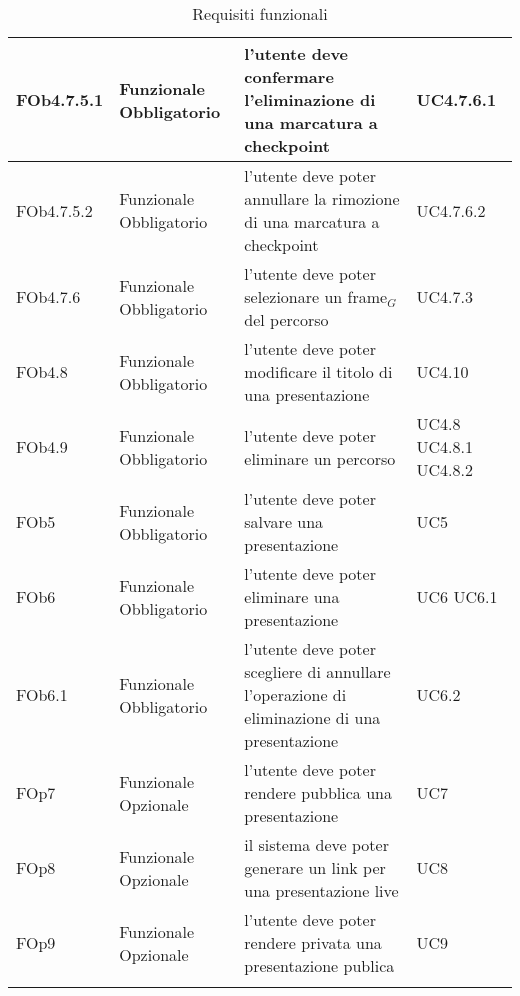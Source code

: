 \begin{longtable}{|l|p{2.5cm}|p{5cm}|p{3.5cm}|}
\hline
FOb4.7.5.1 & Funzionale \linebreak Obbligatorio & l'utente deve confermare l'eliminazione di una marcatura a checkpoint & UC4.7.6.1 \linebreak  \\
\hline
FOb4.7.5.2 & Funzionale \linebreak Obbligatorio & l'utente deve poter annullare la rimozione di una marcatura a checkpoint & UC4.7.6.2 \linebreak  \\
\hline
FOb4.7.6 & Funzionale \linebreak Obbligatorio & l'utente deve poter selezionare un frame$_G$ del percorso & UC4.7.3 \linebreak  \\
\hline
FOb4.8 & Funzionale \linebreak Obbligatorio & l'utente deve poter modificare il titolo di una presentazione & UC4.10 \linebreak  \\
\hline
FOb4.9 & Funzionale \linebreak Obbligatorio & l'utente deve poter eliminare un percorso & UC4.8 \linebreak  UC4.8.1 \linebreak  UC4.8.2 \linebreak  \\
\hline
FOb5 & Funzionale \linebreak Obbligatorio & l'utente deve poter salvare una presentazione & UC5 \linebreak \\
\hline
FOb6 & Funzionale \linebreak Obbligatorio & l'utente deve poter eliminare una presentazione & UC6 \linebreak UC6.1 \linebreak \\
\hline
FOb6.1 & Funzionale \linebreak Obbligatorio & l'utente deve poter scegliere di annullare l'operazione di eliminazione di una presentazione & UC6.2 \linebreak  \\
\hline
FOp7 & Funzionale \linebreak Opzionale & l'utente deve poter rendere pubblica una presentazione & UC7 \linebreak \\
\hline
FOp8 & Funzionale \linebreak Opzionale & il sistema deve poter generare un link per una presentazione live & UC8 \linebreak \\
\hline
FOp9 & Funzionale \linebreak Opzionale & l'utente deve poter rendere privata una presentazione publica & UC9 \linebreak \\
\hline
\caption{Requisiti funzionali}
\end{longtable}
